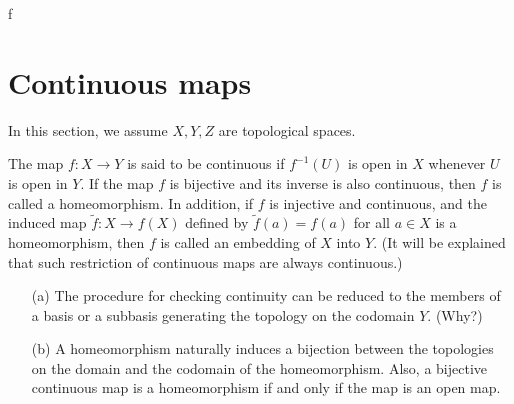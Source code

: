 f\section{Continuous maps}

In this section, we assume $X, Y, Z$ are topological spaces.

\begin{defi}[Continuity]
    The map $f: X\rightarrow Y$ is said to be continuous if $f^{-1}(U)$ is open in $X$ whenever $U$ is open in $Y$.
    If the map $f$ is bijective and its inverse is also continuous, then $f$ is called a homeomorphism.
    In addition, if $f$ is injective and continuous, and the induced map $\widetilde{f}: X\rightarrow f(X)$ defined by $\widetilde{f}(a)=f(a)$ for all $a\in X$ is a homeomorphism, then $f$ is called an embedding of $X$ into $Y$.
    (It will be explained that such restriction of continuous maps are always continuous.)
\end{defi}

\begin{rmk}
    \begin{enumerate}
        \item[(a)]
        {
            The procedure for checking continuity can be reduced to the members of a basis or a subbasis generating the topology on the codomain $Y$. \color{brown}(Why?)\color{black}
        }
        \item[(b)]
        {
            A homeomorphism naturally induces a bijection between the topologies on the domain and the codomain of the homeomorphism. Also, a bijective continuous map is a homeomorphism if and only if the map is an open map.
        }
    \end{enumerate}
\end{rmk}

